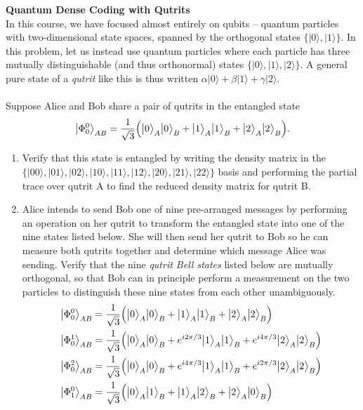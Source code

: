 \documentclass[10pt,letterpaper,boxed,cm]{hmcpset}
\newcommand{\ket}[1]{\big\lvert #1\big\rangle}
\begin{document}
\begin{problem}[2.]
    \textbf{Quantum Dense Coding with Qutrits}\\
    In this course, we have focused almost entirely on qubits -- quantum particles with two-dimensional state spaces, spanned by the orthogonal states $\{\ket{0},\ket{1}\}$.  In this problem, let us instead use quantum particles where each particle has three mutually distinguishable (and thus orthonormal) states $\{\ket{0},\ket{1},\ket{2}\}$.  A general pure state of a \textit{qutrit} like this is thus written $\alpha\ket{0}+\beta\ket{1}+\gamma\ket{2}$.\\\\
    Suppose Alice and Bob share a pair of qutrits in the entangled state
    \[
        \ket{\Phi^0_0}_{AB} = \frac{1}{\sqrt{3}}\Bigl(\ket{0}_A\ket{0}_B + \ket{1}_A\ket{1}_B + \ket{2}_A\ket{2}_B\Bigr).
    \]
    \begin{enumerate}[label=(\alph*)]
        \item Verify that this state is entangled by writing the density matrix in the $\{\ket{00},\ket{01},\ket{02},\ket{10},\ket{11},\ket{12},\ket{20},\ket{21},\ket{22}\}$ basis and performing the partial trace over qutrit A to find the reduced density matrix for qutrit B.
        \item Alice intends to send Bob one of nine pre-arranged messages by performing an operation on her qutrit to transform the entangled state into one of the nine states listed below.  She will then send her qutrit to Bob so he can measure both qutrits together and determine which message Alice was sending.  Verify that the nine \textit{qutrit Bell states} listed below are mutually orthogonal, so that Bob can in principle perform a measurement on the two particles to distinguish these nine states from each other unambiguously.
        \begin{align}
            \ket{\Phi^0_0}_{AB} &= \frac{1}{\sqrt{3}}\Bigl(\ket{0}_A\ket{0}_B + \ket{1}_A\ket{1}_B + \ket{2}_A\ket{2}_B\Bigr) \nonumber \\
            \ket{\Phi^1_0}_{AB} &= \frac{1}{\sqrt{3}}\Bigl(\ket{0}_A\ket{0}_B + e^{i2\pi/3}\ket{1}_A\ket{1}_B + e^{i4\pi/3}\ket{2}_A\ket{2}_B\Bigr) \nonumber \\
            \ket{\Phi^2_0}_{AB} &= \frac{1}{\sqrt{3}}\Bigl(\ket{0}_A\ket{0}_B + e^{i4\pi/3}\ket{1}_A\ket{1}_B + e^{i2\pi/3}\ket{2}_A\ket{2}_B\Bigr) \nonumber \\
            \ket{\Phi^0_1}_{AB} &= \frac{1}{\sqrt{3}}\Bigl(\ket{0}_A\ket{1}_B + \ket{1}_A\ket{2}_B + \ket{2}_A\ket{0}_B\Bigr) \nonumber \\

\end{align}
\end{enumerate}
\end{problem}
\end{document}
